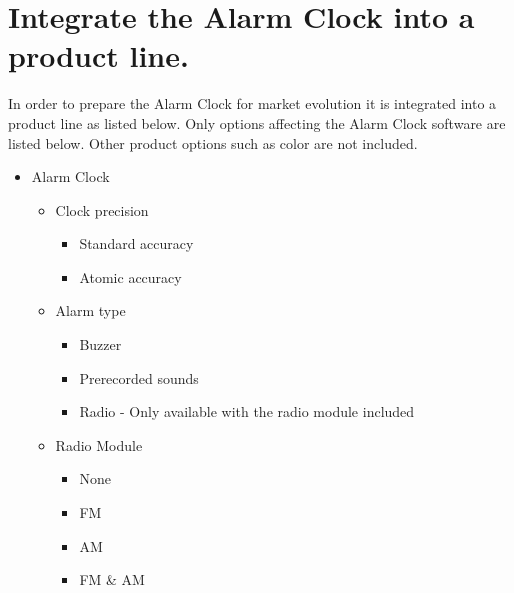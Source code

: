\documentclass[Main_Assignment3]{subfiles}
\begin{document}
\section{Integrate the Alarm Clock into a product line.}

In order to prepare the Alarm Clock for market evolution it is integrated into a product line as listed below.
Only options affecting the Alarm Clock software are listed below. Other product options such as color are not included.
\begin{itemize}
	\item Alarm Clock
	\begin{itemize}
		\item Clock precision
		\begin{itemize}
			\item Standard accuracy
			\item Atomic accuracy
		\end{itemize}
		\item Alarm type
		\begin{itemize}
			\item Buzzer
			\item Prerecorded sounds
			\item Radio - Only available with the radio module included
		\end{itemize}
		\item Radio Module
		\begin{itemize}
			\item None
			\item FM
			\item AM
			\item FM & AM
		\end{itemize}
	\end{itemize}
\end{itemize}
\end{document}
